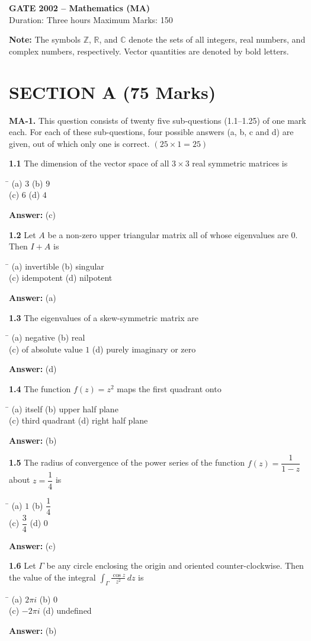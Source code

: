 \documentclass[11pt,a4paper]{article}
\newcommand{\optsfour}[4]{%
  \begin{tabbing}
    \hspace{0.48\linewidth}\=\kill
    (a) #1 \> (b) #2 \\[2pt]
    (c) #3 \> (d) #4
  \end{tabbing}%
}
\newcommand{\ans}[1]{\textbf{Answer:} #1\par\medskip}
\begin{document}
\newpage


\begin{center}
  {\Large\bfseries GATE 2002 -- Mathematics (MA)}\\[4pt]
  {\small Duration: Three hours \quad\textbar\quad Maximum Marks: 150}
\end{center}

\medskip
\textbf{Note:} The symbols $\mathbb{Z}$, $\mathbb{R}$, and $\mathbb{C}$ denote the sets of all integers, real numbers, and complex numbers, respectively. Vector quantities are denoted by bold letters.

\section*{SECTION A (75 Marks)}

\textbf{MA-1.} This question consists of twenty five sub-questions (1.1--1.25) of one mark each. For each of these sub-questions, four possible answers (a, b, c and d) are given, out of which only one is correct. \hfill $(25 \times 1 = 25)$

\medskip

\textbf{1.1} The dimension of the vector space of all $3 \times 3$ real symmetric matrices is
\optsfour{$3$}{$9$}{$6$}{$4$}
\ans{(c)}

\textbf{1.2} Let $A$ be a non-zero upper triangular matrix all of whose eigenvalues are $0$. Then $I + A$ is
\optsfour{invertible}{singular}{idempotent}{nilpotent}
\ans{(a)}

\textbf{1.3} The eigenvalues of a skew-symmetric matrix are
\optsfour{negative}{real}{of absolute value $1$}{purely imaginary or zero}
\ans{(d)}

\textbf{1.4} The function $f(z) = z^2$ maps the first quadrant onto
\optsfour{itself}{upper half plane}{third quadrant}{right half plane}
\ans{(b)}

\textbf{1.5} The radius of convergence of the power series of the function $f(z) = \dfrac{1}{1 - z}$ about $z = \dfrac{1}{4}$ is
\optsfour{$1$}{$\dfrac{1}{4}$}{$\dfrac{3}{4}$}{$0$}
\ans{(c)}

\textbf{1.6} Let $\Gamma$ be any circle enclosing the origin and oriented counter-clockwise. Then the value of the integral $\displaystyle\int_\Gamma \frac{\cos z}{z^2}\,dz$ is
\optsfour{$2\pi i$}{$0$}{$-2\pi i$}{undefined}
\ans{(b)}
\end{document}
